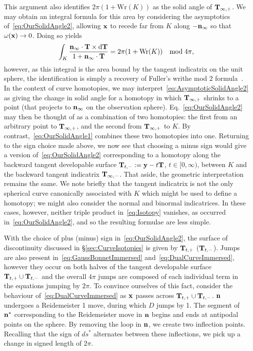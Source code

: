     This argument also identifies $2\pi(1+\mathrm{Wr}(K))$ as the solid angle of $\bf T_{\infty,+}$. We may obtain an integral formula for this area by considering the asymptotics of~\eqref{eq:OurSolidAngle2}, allowing ${\bf x}$ to recede far from $K$ along $-{\bf n}_{\infty}$ so that $\omega({\bf x}) \rightarrow 0$. Doing so yields
    \begin{equation}
        \int_K  \frac{ {\bf n}_\infty \cdot {\bf T} \times \mathrm{d}{\bf T} }{1 + {\bf n}_\infty \cdot {\bf T}} = 2 \pi(1 + \mathrm{Wr}(K))  \quad \textrm{mod}\; 4\pi , 
        \label{eq:AsymptoticSolidAngle2}
    \end{equation}
    however, as this integral is the area bound by the tangent indicatrix on the unit sphere, the identification is simply a recovery of Fuller's writhe mod $2$ formula~\citep{Fuller1978}. In the context of curve homotopies, we may interpret~\eqref{eq:AsymptoticSolidAngle2} as giving the change in solid angle for a homotopy in which $\bf T_{\infty,+}$ shrinks to a point (that projects to ${\bf n}_\infty$ on the observation sphere). Eq.~\eqref{eq:OurSolidAngle2} may then be thought of as a combination of two homotopies: the first from an arbitrary point to $\bf T_{\infty,+}$, and the second from $\bf T_{\infty,+}$ to $K$. By contrast,~\eqref{eq:OurSolidAngle1} combines these two homotopies into one. Returning to the sign choice made above, we now see that choosing a minus sign would give a version of~\eqref{eq:OurSolidAngle2} corresponding to a homotopy along the backward tangent developable surface ${\bf{T}}_{t,-}:={\bf y} - t {\bf T}$, $t\in [0,\infty)$, between $K$ and the backward tangent indicatrix $\bf T_{\infty,-}$. That aside, the geometric interpretation remains the same. We note briefly that the tangent indicatrix is not the only spherical curve canonically associated with $K$ which might be used to define a homotopy; we might also consider the normal and binormal indicatrices. In these cases, however, neither triple product in~\eqref{eq:Isotopy} vanishes, as occurred in~\eqref{eq:OurSolidAngle2}, and so the resulting formulae are less simple. 

    With the choice of plus (minus) sign in~\eqref{eq:OurSolidAngle2}, the surface of discontinuity discussed in \S\ref{sec:CurveIsotopies} is given by ${\bf T}_{t,+}$ (${\bf T}_{t,-}$). Jumps are also present in~\eqref{eq:GaussBonnetImmersed} and~\eqref{eq:DualCurveImmersed}, however they occur on both halves of the tangent developable surface ${\bf T}_{t,+}\cup {\bf T}_{t,-}$ and the overall $4 \pi$ jumps are composed of each individual term in the equations jumping by $2 \pi$. To convince ourselves of this fact, consider the behaviour of~\eqref{eq:DualCurveImmersed} as ${\bf x}$ passes across ${\bf T}_{t,+}\cup {\bf T}_{t,-}$. ${\bf n}$ undergoes a Reidemeister 1 move, during which $D$ jumps by 1. The segment of ${\bf n}^*$ corresponding to the Reidemeister move in ${\bf n}$ begins and ends at antipodal points on the sphere. By removing the loop in ${\bf n}$, we create two inflection points. Recalling that the sign of $ds^*$ alternates between these inflections, we pick up a change in signed length of $2 \pi$.


